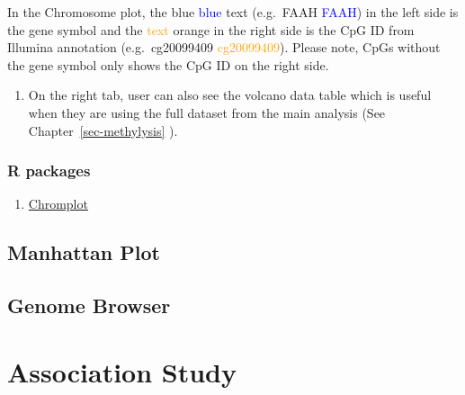 \documentclass[
  a4paper,
  DIV=11,
  numbers=noendperiod,
  oneside,
  open=any]{scrreport}
\providecommand{\tightlist}{%
  \setlength{\itemsep}{0pt}\setlength{\parskip}{0pt}}\usepackage{longtable,booktabs,array}
\begin{document}
\begin{tcolorbox}[enhanced jigsaw, opacityback=0, toprule=.15mm, bottomtitle=1mm, colback=white, rightrule=.15mm, breakable, coltitle=black, colbacktitle=quarto-callout-note-color!10!white, toptitle=1mm, arc=.35mm, colframe=quarto-callout-note-color-frame, bottomrule=.15mm, opacitybacktitle=0.6, titlerule=0mm, leftrule=.75mm, title=\textcolor{quarto-callout-note-color}{\faInfo}\hspace{0.5em}{Note}, left=2mm]

In the Chromosome plot, the {blue} \textcolor{blue}{blue} text
(e.g.~{FAAH} \textcolor{blue}{FAAH}) in the left side is the gene symbol
and the \textcolor{orange}{text} {orange} in the right side is the CpG
ID from Illumina annotation (e.g.~{cg20099409}
\textcolor{orange}{cg20099409}). Please note, CpGs without the gene
symbol only shows the CpG ID on the right side.

\end{tcolorbox}

\begin{enumerate}
\def\labelenumi{\arabic{enumi}.}
\setcounter{enumi}{2}
\tightlist
\item
  On the right tab, user can also see the volcano data table which is
  useful when they are using the full dataset from the main analysis
  (See Chapter~\ref{sec-methylysis} ).
\end{enumerate}

\section{R packages}\label{r-packages}

\begin{enumerate}
\def\labelenumi{\arabic{enumi}.}
\tightlist
\item
  \href{https://www.bioconductor.org/packages/release/bioc/vignettes/chromPlot/inst/doc/chromPlot.pdf}{Chromplot}
\end{enumerate}

\chapter{Manhattan Plot}\label{manhattan-plot}

\chapter{Genome Browser}\label{genome-browser}

\part{Association Study}
\end{document}
